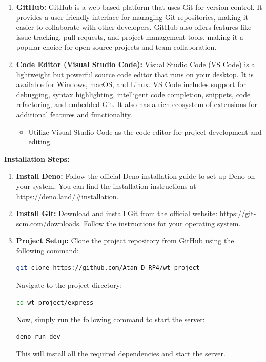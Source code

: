 \begin{enumerate}
  \item \textbf{GitHub:}
    GitHub is a web-based platform that uses Git for version control. It
    provides a user-friendly interface for managing Git repositories, making it
    easier to collaborate with other developers. GitHub also offers features
    like issue tracking, pull requests, and project management tools, making it
    a popular choice for open-source projects and team collaboration.

  \item \textbf{Code Editor (Visual Studio Code):}
    Visual Studio Code (VS Code) is a lightweight but powerful source code
    editor that runs on your desktop. It is available for Windows, macOS, and
    Linux. VS Code includes support for debugging, syntax highlighting,
    intelligent code completion, snippets, code refactoring, and embedded
    Git. It also has a rich ecosystem of extensions for additional features
    and functionality.
    \begin{itemize}
      \item Utilize Visual Studio Code as the code editor for project
        development
        and editing.
    \end{itemize}
\end{enumerate}

\textbf{Installation Steps:}
\begin{enumerate}
  \item \textbf{Install Deno:}
    Follow the official Deno installation guide to set up Deno on your system.
    You can find the installation instructions at
    \url{https://deno.land/#installation}.

  \item \textbf{Install Git:}
    Download and install Git from the official website:
    \url{https://git-scm.com/downloads}. Follow the instructions for your
    operating system.

  \item \textbf{Project Setup:}
    Clone the project repository from GitHub using the following command:
    \begin{lstlisting}[language=bash]
        git clone https://github.com/Atan-D-RP4/wt_project
    \end{lstlisting}
    Navigate to the project directory:
    \begin{lstlisting}[language=bash]
        cd wt_project/express
    \end{lstlisting}
    Now, simply run the following command to start the server:
    \begin{lstlisting}[language=bash]
        deno run dev
    \end{lstlisting}
    This will install all the required dependencies and start the server.
\end{enumerate}

